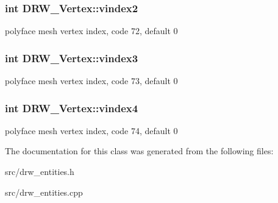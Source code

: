 \subsubsection[{vindex2}]{\setlength{\rightskip}{0pt plus 5cm}int D\+R\+W\+\_\+\+Vertex\+::vindex2}\label{class_d_r_w___vertex_a48f459a7d3627c898fa9e1be5b0de6d6}
polyface mesh vertex index, code 72, default 0 \hypertarget{class_d_r_w___vertex_a43d78abe4c3bacad98ef2a65216e225e}{}
\subsubsection[{vindex3}]{\setlength{\rightskip}{0pt plus 5cm}int D\+R\+W\+\_\+\+Vertex\+::vindex3}\label{class_d_r_w___vertex_a43d78abe4c3bacad98ef2a65216e225e}
polyface mesh vertex index, code 73, default 0 \hypertarget{class_d_r_w___vertex_a1f2c2a799721fe8e6290c6121c190ad8}{}
\subsubsection[{vindex4}]{\setlength{\rightskip}{0pt plus 5cm}int D\+R\+W\+\_\+\+Vertex\+::vindex4}\label{class_d_r_w___vertex_a1f2c2a799721fe8e6290c6121c190ad8}
polyface mesh vertex index, code 74, default 0 

The documentation for this class was generated from the following files\+:\begin{DoxyCompactItemize}
\item 
src/drw\+\_\+entities.\+h\item 
src/drw\+\_\+entities.\+cpp\end{DoxyCompactItemize}
